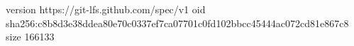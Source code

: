version https://git-lfs.github.com/spec/v1
oid sha256:c8b8d3e38ddea80e70c0337ef7ca07701c0fd102bbcc45444ac072cd81e867c8
size 166133
